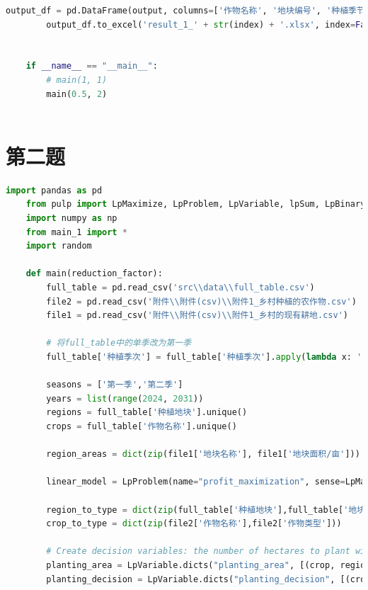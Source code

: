 \documentclass{cumcmthesis}
\begin{document}
\begin{appendices}
\begin{lstlisting}[language=python]
        output_df = pd.DataFrame(output, columns=['作物名称', '地块编号', '种植季节','年份', '种植数量'])
        output_df.to_excel('result_1_' + str(index) + '.xlsx', index=False)
    

    if __name__ == "__main__":
        # main(1, 1)
        main(0.5, 2)
    
\end{lstlisting}

\section{第二题}
\begin{lstlisting}[language=python]
    import pandas as pd
    from pulp import LpMaximize, LpProblem, LpVariable, lpSum, LpBinary
    import numpy as np
    from main_1 import *
    import random
    
    def main(reduction_factor):
        full_table = pd.read_csv('src\\data\\full_table.csv')
        file2 = pd.read_csv('附件\\附件(csv)\\附件1_乡村种植的农作物.csv')
        file1 = pd.read_csv('附件\\附件(csv)\\附件1_乡村的现有耕地.csv')
        
        # 将full_table中的单季改为第一季
        full_table['种植季次'] = full_table['种植季次'].apply(lambda x: '第一季' if x == '单季' else x)
    
        seasons = ['第一季','第二季']
        years = list(range(2024, 2031))
        regions = full_table['种植地块'].unique()
        crops = full_table['作物名称'].unique()
    
        region_areas = dict(zip(file1['地块名称'], file1['地块面积/亩']))
        
        linear_model = LpProblem(name="profit_maximization", sense=LpMaximize)
        
        region_to_type = dict(zip(full_table['种植地块'],full_table['地块类型']))
        crop_to_type = dict(zip(file2['作物名称'],file2['作物类型']))
    
        # Create decision variables: the number of hectares to plant with [each crop] in [each region] at [each year] at [each season] and the decision to plant or not
        planting_area = LpVariable.dicts("planting_area", [(crop, region, year, season) for crop in crops for region in regions for year in years for season in seasons], lowBound=0, cat='Continuous')
        planting_decision = LpVariable.dicts("planting_decision", [(crop, region, year, season) for crop in crops for region in regions for year in years for season in seasons], cat='Binary')
    

\end{lstlisting}
\end{appendices}
\end{document}
